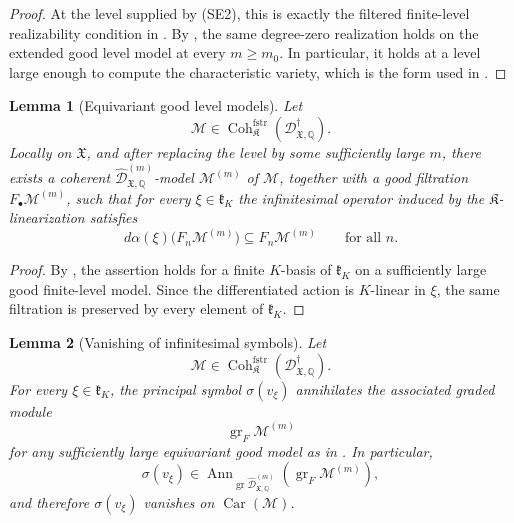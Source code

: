 \documentclass[11pt]{amsart}
\theoremstyle{plain}
\newtheorem{lemma}{Lemma}[section]
\theoremstyle{definition}
\theoremstyle{remark}
\newcommand{\Coh}{\operatorname{Coh}}
\newcommand{\Car}{\operatorname{Car}}
\newcommand{\gr}{\operatorname{gr}}
\newcommand{\fstr}{\mathrm{fstr}}
\begin{document}
\begin{proof}
At the level supplied by \textup{(SE2)}, this is exactly the filtered
finite-level realizability condition in . By
, the same degree-zero realization holds on the
extended good level model at every \(m\ge m_0\). In particular, it holds at a
level large enough to compute the characteristic variety, which is the form used
in .
\end{proof}


\begin{lemma}[Equivariant good level models]
\label{lem:equivariant-good-models}
Let
\[
  \mathcal M\in
  \Coh^{\fstr}_{\mathfrak K}
  (\mathscr D^\dagger_{\mathfrak X,\mathbb Q}).
\]
Locally on \(\mathfrak X\), and after replacing the level by some sufficiently
large \(m\), there exists a coherent
\(\widehat{\mathscr D}^{(m)}_{\mathfrak X,\mathbb Q}\)-model
\(\mathcal M^{(m)}\) of \(\mathcal M\), together with a good filtration
\(F_\bullet\mathcal M^{(m)}\), such that for every
\(\xi\in\mathfrak k_K\) the infinitesimal operator induced by the
\(\mathfrak K\)-linearization satisfies
\[
  d\alpha(\xi)\bigl(F_n\mathcal M^{(m)}\bigr)
  \subseteq
  F_n\mathcal M^{(m)}
  \qquad\text{for all }n.
\]
\end{lemma}

\begin{proof}
By , the assertion holds for a
finite \(K\)-basis of \(\mathfrak k_K\) on a sufficiently large good
finite-level model.  Since the differentiated action is \(K\)-linear in
\(\xi\), the same filtration is preserved by every element of
\(\mathfrak k_K\).
\end{proof}

\begin{lemma}[Vanishing of infinitesimal symbols]
\label{lem:symbols-fundamental-fields}
Let
\[
  \mathcal M\in
  \Coh^{\fstr}_{\mathfrak K}
  (\mathscr D^\dagger_{\mathfrak X,\mathbb Q}).
\]
For every \(\xi\in\mathfrak k_K\), the principal symbol
\(\sigma(v_\xi)\) annihilates the associated graded module
\[
  \gr_F\mathcal M^{(m)}
\]
for any sufficiently large equivariant good model as in
. In particular,
\[
  \sigma(v_\xi)
  \in
  \operatorname{Ann}_{\gr\widehat{\mathscr D}^{(m)}_{\mathfrak X,\mathbb Q}}
  (\gr_F\mathcal M^{(m)}),
\]
and therefore \(\sigma(v_\xi)\) vanishes on \(\Car(\mathcal M)\).
\end{lemma}
\end{document}
